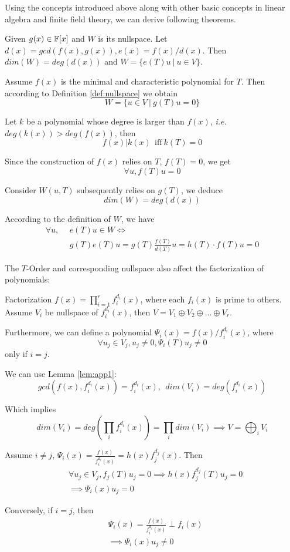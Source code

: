 Using the concepts introduced above along with other basic concepts in linear algebra and finite field theory,
we can derive following theorems.

\begin{Lemma}
\label{lem:app1}
Given $g(x) \in {\mathbb{F}}[x]$ and $W$ is its nullspace. Let $d(x) = gcd(f(x),g(x)), e(x) = f(x)/d(x)$. 
Then $dim(W) = deg(d(x))$ and $W = \{e(T)u~|~u \in V\}$.
\end{Lemma}
\begin{Proof}
Assume $f(x)$ is the minimal and characteristic polynomial for $T$. Then according to Definition \ref{def:nullspace}
we obtain 
$$W = \{u\in V~|~g(T)u = 0\}$$

Let $k$ be a polynomial whose degree is larger than $f(x)$, {\it i.e.} $deg(k(x))>deg(f(x))$, then
$$f(x)|k(x)~~\text{iff}~k(T)=0$$

Since the construction of $f(x)$ relies on $T$, $f(T) = 0$, we get
$$\forall u, f(T)u = 0$$

Consider $W(u,T)$ subsequently relies on $g(T)$, we deduce 
$$dim(W) = deg(d(x))$$

According to the definition of $W$, we have
\begin{align*}
\forall u,~~& e(T)u \in W \Longleftrightarrow \\
& g(T)e(T)u = g(T)\frac{f(T)}{d(T)} u = h(T)\cdot f(T) u = 0
\end{align*}
\end{Proof}

The $T$-Order and corresponding nullspace also affect the factorization of polynomials:
\begin{Lemma}[Factorization of $f(x)$]
Factorization $f(x) = \prod_{i=1}^{r} f_{i}^{d_i} (x)$, where each $f_i(x)$ is prime to others. 
Assume $V_i$ be nullspace of $f_{i}^{d_i} (x)$, then $V = V_1\oplus V_2 \oplus \dots\oplus V_r$.

Furthermore, we can define a polynomial $\Psi_i(x) = f(x)/f_{i}^{d_i} (x)$, where 
$$\forall u_j \in V_j, u_j \neq 0, \Psi_i(T)u_j \neq 0$$
only if $i = j$.
\end{Lemma}
\begin{Proof}
We can use Lemma \ref{lem:app1}:
$$gcd(f(x),f_{i}^{d_i} (x)) = f_{i}^{d_i} (x),~~dim(V_i) = deg(f_{i}^{d_i} (x))$$

Which implies 
$$dim(V_i) = deg\left(\prod_i f_{i}^{d_i} (x)\right) = \prod_i dim(V_i) \implies V = \bigoplus_i V_i$$

Assume $i\neq j$, $\Psi_i(x) = \frac{f(x)}{f_{i}^{d_i} (x)} = h(x)f_{j}^{d_j} (x)$. Then
\begin{align*}
&\forall u_j\in V_j, f_j(T)u_j = 0 \implies h(x)f_{j}^{d_j} (T)u_j = 0 \\
& \implies \Psi_i(x)u_j = 0
\end{align*}

Conversely, if $i=j$, then
\begin{align*}
& \Psi_i(x) = \frac{f(x)}{f_{i}^{d_i} (x)} \perp f_i(x) \\
& \implies \Psi_i(x)u_j \neq 0
\end{align*}
\end{Proof}

